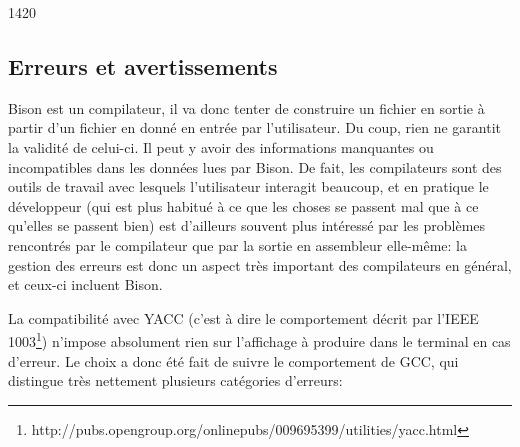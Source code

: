 \documentclass[a4paper,11pt,twoside,final]{article}
\begin{document}
  \begin{adjustwidth}{-4cm}{-2cm}
  \begin{gantt}[xunitlength=0.7cm,fontsize=\small,titlefontsize=\small,drawledgerline=true]{14}{20}
    \begin{ganttitle}
    \end{ganttitle}
    \begin{ganttitle}
    \end{ganttitle}
    \begin{ganttitle}
    \end{ganttitle}
  \end{gantt}
  \end{adjustwidth}

  \subsection{Erreurs et avertissements}

  Bison est un compilateur, il va donc tenter de construire un fichier en
  sortie à partir d'un fichier en donné en entrée par l'utilisateur. Du coup,
  rien ne garantit la validité de celui-ci. Il peut y avoir des informations
  manquantes ou incompatibles dans les données lues par Bison. De fait, les
  compilateurs sont des outils de travail avec lesquels l'utilisateur interagit
  beaucoup, et en pratique le développeur (qui est plus habitué à ce que les
  choses se passent mal que à ce qu'elles se passent bien) est d'ailleurs
  souvent plus intéressé par les problèmes rencontrés par le compilateur que
  par la sortie en assembleur elle-même: la gestion des erreurs est donc un
  aspect très important des compilateurs en général, et ceux-ci incluent Bison.

  La compatibilité avec YACC (c'est à dire le comportement décrit par l'IEEE
  1003\footnote{%
  http://pubs.opengroup.org/onlinepubs/009695399/utilities/yacc.html}) n'impose
  absolument rien sur l'affichage à produire dans le terminal en cas d'erreur.
  Le choix a donc été fait de suivre le comportement de GCC, qui distingue très
  nettement plusieurs catégories d'erreurs:
\end{document}

